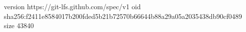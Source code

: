 version https://git-lfs.github.com/spec/v1
oid sha256:f2411e8584017b200fded5b21b72570b66644b88a29a05a2035438db90cf0489
size 43840
